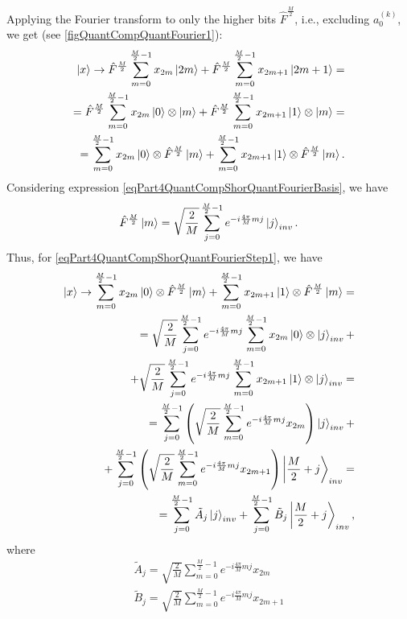 Applying the Fourier transform to only the higher bits $\hat{F}^{\frac{M}{2}}$, i.e., excluding $a^{(k)}_0$, we get (see \autoref{figQuantCompQuantFourier1}):
\begin{eqnarray}
\ket{x} \rightarrow
\hat{F}^{\frac{M}{2}} \sum_{m = 0}^{\frac{M}{2} - 1}x_{2m} \ket{2m} +
\hat{F}^{\frac{M}{2}} \sum_{m = 0}^{\frac{M}{2} - 1}x_{2m + 1}
\ket{2m+1} = 
\nonumber \\
=
\hat{F}^{\frac{M}{2}} \sum_{m = 0}^{\frac{M}{2} - 1}x_{2m} 
\ket{0} \otimes  \ket{m} +
\hat{F}^{\frac{M}{2}} \sum_{m = 0}^{\frac{M}{2} - 1}x_{2m + 1}
\ket{1} \otimes  \ket{m}
=
\nonumber \\
=
\sum_{m = 0}^{\frac{M}{2} - 1}x_{2m} 
\ket{0} \otimes \hat{F}^{\frac{M}{2}} \ket{m} +
\sum_{m = 0}^{\frac{M}{2} - 1}x_{2m + 1}
\ket{1} \otimes \hat{F}^{\frac{M}{2}} \ket{m}.
\label{eqPart4QuantCompShorQuantFourierStep1}
\end{eqnarray}
Considering expression \eqref{eqPart4QuantCompShorQuantFourierBasis}, we have
\begin{equation}
\hat{F}^{\frac{M}{2}} \ket{m} = \sqrt{\frac{2}{M}}
\sum_{j= 0}^{\frac{M}{2} - 1} e^{-i \frac{4 \pi}{M} m j}\ket{j}_{inv}.
\nonumber
\end{equation}
Thus, for \eqref{eqPart4QuantCompShorQuantFourierStep1}, we have
\begin{eqnarray}
\ket{x} \rightarrow
\sum_{m = 0}^{\frac{M}{2} - 1}x_{2m} 
\ket{0} \otimes \hat{F}^{\frac{M}{2}} \ket{m} +
\sum_{m = 0}^{\frac{M}{2} - 1}x_{2m + 1}
\ket{1} \otimes \hat{F}^{\frac{M}{2}} \ket{m} = 
\nonumber \\
=
\sqrt{\frac{2}{M}} \sum_{j = 0}^{\frac{M}{2} - 1} e^{-i \frac{4 \pi}{M} m j} 
\sum_{m = 0}^{\frac{M}{2} - 1}x_{2m} \ket{0} \otimes
\ket{j}_{inv}
+
\nonumber \\
+
\sqrt{\frac{2}{M}} \sum_{j = 0}^{\frac{M}{2} - 1} e^{-i \frac{4 \pi}{M} m j} 
\sum_{m = 0}^{\frac{M}{2} - 1}x_{2m+1} \ket{1} \otimes
\ket{j}_{inv}
=
\nonumber \\
=
\sum_{j = 0}^{\frac{M}{2} - 1}  
\left( \sqrt{\frac{2}{M}} 
\sum_{m = 0}^{\frac{M}{2} - 1} e^{-i \frac{4 \pi}{M} m j} x_{2m} 
\right) \ket{j}_{inv}
+
\nonumber \\
+
\sum_{j = 0}^{\frac{M}{2} - 1}
\left( \sqrt{\frac{2}{M}}  
\sum_{m = 0}^{\frac{M}{2} - 1}e^{-i \frac{4 \pi}{M} m j} x_{2m+1} 
\right)
\left|\frac{M}{2} + j\right>_{inv}
=
\nonumber \\
= \sum^{\frac{M}{2} - 1}_{j = 0}  \tilde{A}_{j} \ket{j}_{inv} +
\sum^{\frac{M}{2} - 1}_{j = 0}  \tilde{B}_{j} \left|\frac{M}{2} + j\right>_{inv},
\nonumber
\end{eqnarray}
where
\begin{eqnarray}
\tilde{A}_{j} = 
\sqrt{\frac{2}{M}} 
\sum_{m = 0}^{\frac{M}{2} - 1} e^{-i \frac{4 \pi}{M} m j} x_{2m} 
\nonumber \\
\tilde{B}_{j} =
\sqrt{\frac{2}{M}} 
\sum_{m = 0}^{\frac{M}{2} - 1} e^{-i \frac{4 \pi}{M} m j} x_{2m+1} 
\label{eqPart4QuantCompShorAB}
\end{eqnarray}

